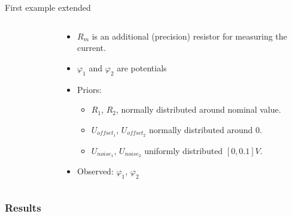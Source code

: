 \documentclass{beamer}
\begin{document}
  \begin{frame}{First example extended}
    \begin{columns}
      \begin{column}{0.3\textwidth}
        \begin{figure}
          \centering
        \end{figure}
      \end{column}
      \begin{column}{.7\textwidth}
        \begin{itemize}
          \item $R_m$ is an additional (precision) resistor for measuring the current.
          \item $\varphi_1$ and $\varphi_2$ are potentials 
          \item Priors:
          \begin{itemize}
            \item  $R_1$, $R_2$, normally distributed around nominal value.
            \item $U_{offset_{1}}$, $U_{offset_{2}}$ normally distributed around 0.
            \item $U_{noise_{1}}$, $U_{noise_{2}}$ uniformly distributed $[0,0.1]V$.
          \end{itemize}
          \item Observed: $\varphi_1$, $\varphi_2$
        \end{itemize}
      \end{column}
    \end{columns}
  \end{frame}
  \begin{frame}
    \frametitle{Results}
    
  \end{frame}
\end{document}
